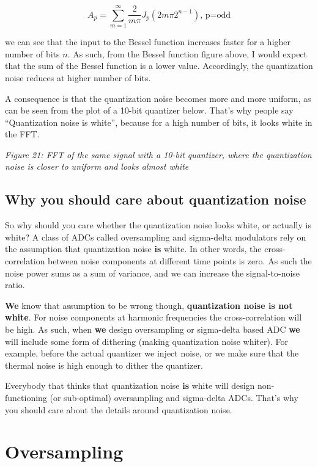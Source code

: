 \[ A_p =  \sum_{m=1}^\infty{\frac{2}{m\pi}J_p(2m\pi 2^{n-1}  ) }\text{,  p=odd} \]

we can see that the input to the Bessel function increases faster for a
higher number of bits \(n\). As such, from the Bessel function figure
above, I would expect that the sum of the Bessel function is a lower
value. Accordingly, the quantization noise reduces at higher number of
bits.

A consequence is that the quantization noise becomes more and more
uniform, as can be seen from the plot of a 10-bit quantizer below.
That's why people say ``Quantization noise is white'', because for a
high number of bits, it looks white in the FFT.


{
\centering
{}
}

\emph{Figure 21: FFT of the same signal with a 10-bit quantizer, where
the quantization noise is closer to uniform and looks almost white}

\subsection{Why you should care about quantization
noise}\label{why-you-should-care-about-quantization-noise}

So why should you care whether the quantization noise looks white, or
actually is white? A class of ADCs called oversampling and sigma-delta
modulators rely on the assumption that quantization noise \textbf{is}
white. In other words, the cross-correlation between noise components at
different time points is zero. As such the noise power sums as a sum of
variance, and we can increase the signal-to-noise ratio.

\textbf{We} know that assumption to be wrong though,
\textbf{quantization noise is not white}. For noise components at
harmonic frequencies the cross-correlation will be high. As such, when
\textbf{we} design oversampling or sigma-delta based ADC \textbf{we}
will include some form of dithering (making quantization noise whiter).
For example, before the actual quantizer we inject noise, or we make
sure that the thermal noise is high enough to dither the quantizer.

Everybody that thinks that quantization noise \textbf{is} white will
design non-functioning (or sub-optimal) oversampling and sigma-delta
ADCs. That's why you should care about the details around quantization
noise.

\section{Oversampling}\label{oversampling}

